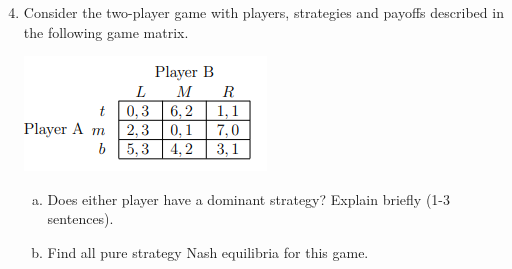 \documentclass[11pt]{article}
\begin{document}
\begin{enumerate}
	\setcounter{enumi}{3}
	\item  Consider the two-player game with players, strategies and payoffs described in the following game matrix.
	\begin{center}
		\includegraphics[scale=1.0]{Figure1.2}
	\end{center}
	\begin{enumerate}[(a)]
		\item Does either player have a dominant strategy? Explain briefly (1-3 sentences).
		\item Find all pure strategy Nash equilibria for this game.
	\end{enumerate}
\end{enumerate}
\end{document}
